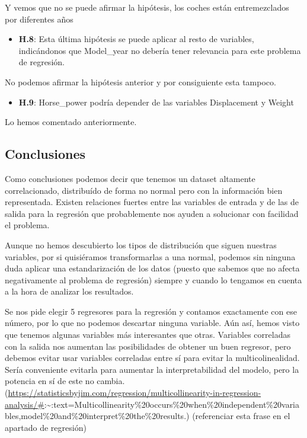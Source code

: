 Y vemos que no se puede afirmar la hipótesis, los coches están entremezclados por diferentes años

\begin{itemize}
\item \textbf{H.8}: Esta última hipótesis se puede aplicar al resto de variables, indicándonos que Model\_year no debería tener relevancia para este problema de regresión.
\end{itemize}

No podemos afirmar la hipótesis anterior y por consiguiente esta tampoco.

\begin{itemize}
\item \textbf{H.9}: Horse\_power podría depender de las variables Displacement y Weight
\end{itemize}

Lo hemos comentado anteriormente.

\subsection{Conclusiones}

Como conclusiones podemos decir que tenemos un dataset altamente correlacionado, distribuído de forma no normal pero con la información bien representada. Existen relaciones fuertes entre las variables de entrada y de las de salida para la regresión que probablemente nos ayuden a solucionar con facilidad el problema.

Aunque no hemos descubierto los tipos de distribución que siguen nuestras variables, por si quisiéramos transformarlas a una normal, podemos sin ninguna duda aplicar una estandarización de los datos (puesto que sabemos que no afecta negativamente al problema de regresión) siempre y cuando lo tengamos en cuenta a la hora de analizar los resultados.

Se nos pide elegir 5 regresores para la regresión y contamos exactamente con ese número, por lo que no podemos descartar ninguna variable. Aún así, hemos visto que tenemos algunas variables más interesantes que otras. Variables correladas con la salida nos aumentan las posibilidades de obtener un buen regresor, pero debemos evitar usar variables correladas entre sí para evitar la multicolinealidad. Sería conveniente evitarla para aumentar la interpretabilidad del modelo, pero la potencia en sí de este no cambia. (\url{https://statisticsbyjim.com/regression/multicollinearity-in-regression-analysis/\#}:\textasciitilde:text=Multicollinearity\%20occurs\%20when\%20independent\%20variables,model\%20and\%20interpret\%20the\%20results.) (referenciar esta frase en el apartado de regresión)